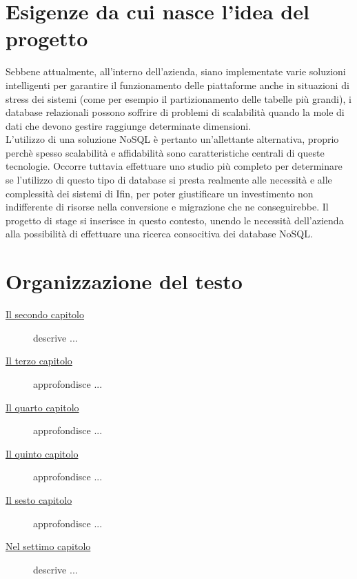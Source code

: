 \section{Esigenze da cui nasce l'idea del progetto}

Sebbene attualmente, all'interno dell'azienda, siano implementate varie soluzioni intelligenti per garantire il funzionamento delle piattaforme anche in situazioni di stress dei sistemi (come per esempio il partizionamento delle tabelle più grandi), i database relazionali possono soffrire di problemi di scalabilità quando la mole di dati che devono gestire raggiunge determinate dimensioni.\\
L'utilizzo di una soluzione NoSQL è pertanto un'allettante alternativa, proprio perchè spesso scalabilità e affidabilità sono caratteristiche centrali di queste tecnologie. Occorre tuttavia effettuare uno studio più completo per determinare se l'utilizzo di questo tipo di database si presta realmente alle necessità e alle complessità dei sistemi di Ifin, per poter giustificare un investimento non indifferente di risorse nella conversione e migrazione che ne conseguirebbe.
Il progetto di stage si inserisce in questo contesto, unendo le necessità dell'azienda alla possibilità di effettuare una ricerca consocitiva dei database NoSQL.\\

\section{Organizzazione del testo}

\begin{description}
    \item[{\hyperref[cap:processi-metodologie]{Il secondo capitolo}}] descrive ...
    
    \item[{\hyperref[cap:descrizione-stage]{Il terzo capitolo}}] approfondisce ...
    
    \item[{\hyperref[cap:analisi-requisiti]{Il quarto capitolo}}] approfondisce ...
    
    \item[{\hyperref[cap:progettazione-codifica]{Il quinto capitolo}}] approfondisce ...
    
    \item[{\hyperref[cap:verifica-validazione]{Il sesto capitolo}}] approfondisce ...
    
    \item[{\hyperref[cap:conclusioni]{Nel settimo capitolo}}] descrive ...
\end{description}


